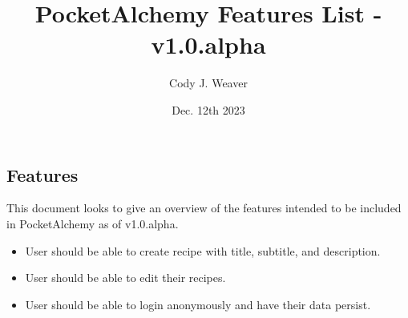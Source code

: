 \documentclass[12pt]{article}
\begin{document}
\title{PocketAlchemy Features List - v1.0.alpha}
\author{Cody J. Weaver}
\date{Dec. 12th 2023}
\maketitle

\begin{center}
    \section*{Features}
    \indent This document looks to give an overview of the 
    features intended to be included
    in PocketAlchemy as of v1.0.alpha.

    \begin{itemize}
        \item User should be able to create recipe with title, 
        subtitle, and description.

        \item User should be able to edit their recipes.
        
        \item User should be able to login anonymously and have their
        data persist.

    \end{itemize}

\end{center}
\end{document}
